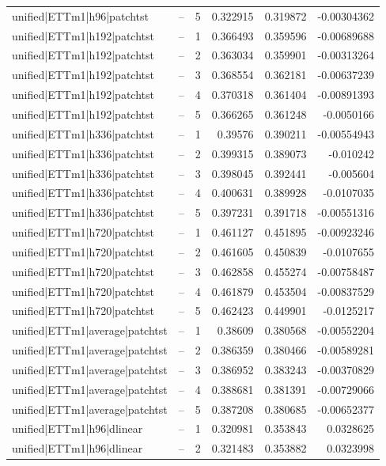 \begin{longtable}{llrrrr}
unified|ETTm1|h96|patchtst & -- & 5 & 0.322915 & 0.319872 & -0.00304362 \\
unified|ETTm1|h192|patchtst & -- & 1 & 0.366493 & 0.359596 & -0.00689688 \\
unified|ETTm1|h192|patchtst & -- & 2 & 0.363034 & 0.359901 & -0.00313264 \\
unified|ETTm1|h192|patchtst & -- & 3 & 0.368554 & 0.362181 & -0.00637239 \\
unified|ETTm1|h192|patchtst & -- & 4 & 0.370318 & 0.361404 & -0.00891393 \\
unified|ETTm1|h192|patchtst & -- & 5 & 0.366265 & 0.361248 & -0.0050166 \\
unified|ETTm1|h336|patchtst & -- & 1 & 0.39576 & 0.390211 & -0.00554943 \\
unified|ETTm1|h336|patchtst & -- & 2 & 0.399315 & 0.389073 & -0.010242 \\
unified|ETTm1|h336|patchtst & -- & 3 & 0.398045 & 0.392441 & -0.005604 \\
unified|ETTm1|h336|patchtst & -- & 4 & 0.400631 & 0.389928 & -0.0107035 \\
unified|ETTm1|h336|patchtst & -- & 5 & 0.397231 & 0.391718 & -0.00551316 \\
unified|ETTm1|h720|patchtst & -- & 1 & 0.461127 & 0.451895 & -0.00923246 \\
unified|ETTm1|h720|patchtst & -- & 2 & 0.461605 & 0.450839 & -0.0107655 \\
unified|ETTm1|h720|patchtst & -- & 3 & 0.462858 & 0.455274 & -0.00758487 \\
unified|ETTm1|h720|patchtst & -- & 4 & 0.461879 & 0.453504 & -0.00837529 \\
unified|ETTm1|h720|patchtst & -- & 5 & 0.462423 & 0.449901 & -0.0125217 \\
unified|ETTm1|average|patchtst & -- & 1 & 0.38609 & 0.380568 & -0.00552204 \\
unified|ETTm1|average|patchtst & -- & 2 & 0.386359 & 0.380466 & -0.00589281 \\
unified|ETTm1|average|patchtst & -- & 3 & 0.386952 & 0.383243 & -0.00370829 \\
unified|ETTm1|average|patchtst & -- & 4 & 0.388681 & 0.381391 & -0.00729066 \\
unified|ETTm1|average|patchtst & -- & 5 & 0.387208 & 0.380685 & -0.00652377 \\
unified|ETTm1|h96|dlinear & -- & 1 & 0.320981 & 0.353843 & 0.0328625 \\
unified|ETTm1|h96|dlinear & -- & 2 & 0.321483 & 0.353882 & 0.0323998 \\

\end{longtable}
